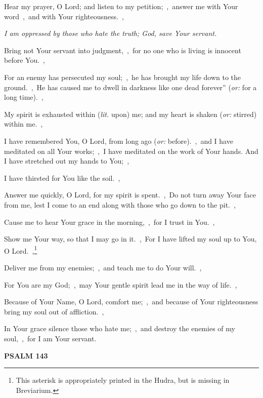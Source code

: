 \documentclass[12pt,twoside,a5paper]{article}
\newcommand{\psalm}[1]{\textbf{PSALM {#1}}\nopagebreak}
\newcommand{\qanona}[1]{{\liturgicalhint{Qanona.} \emph{#1}}}
\newcommand{\translationoption}[1]{\emph{or:} #1}
\newcommand{\translationliteral}[1]{\emph{lit.} #1}
\begin{document}
\begin{normalparskip}
  Hear my prayer, O Lord; and listen to my petition;~\sep\ answer me with Your word~\sep\ and with Your righteousness.~\sep

  \qanona{I am oppressed by those who hate the truth; God, save Your servant.}

  Bring not Your servant into judgment,~\sep\ for no one who is living is innocent before You.~\sep

  For an enemy has persecuted my soul;~\sep\ he has brought my life down to the ground.~\sep\ He has caused me to dwell in darkness like one dead forever'' (\translationoption{for a long time}).~\sep

  My spirit is exhausted within (\translationliteral{upon}) me; and my heart is shaken (\translationoption{stirred}) within me.~\sep

  I have remembered You, O Lord, from long ago (\translationoption{before}).~\sep\ and I have meditated on all Your works;~\sep\ I have meditated on the work of Your hands. And I have stretched out my hands to You;~\sep

  I have thirsted for You like the soil.~\sep

  Answer me quickly, O Lord, for my spirit is spent.~\sep\ Do not turn away Your face from me, lest I come to an end along with those who go down to the pit.~\sep

  Cause me to hear Your grace in the morning,~\sep\ for I trust in You.~\sep

  Show me Your way, so that I may go in it.~\sep\ For I have lifted my soul up to You, O Lord.~\sep\footnote{This asterisk is appropriately printed in the Hudra, but is missing in Breviarium.}

  Deliver me from my enemies;~\sep\ and teach me to do Your will.~\sep

  For You are my God;~\sep\ may Your gentle spirit lead me in the way of life.~\sep

  Because of Your Name, O Lord, comfort me;~\sep\ and because of Your righteousness bring my soul out of affliction.~\sep

  In Your grace silence those who hate me;~\sep\ and destroy the enemies of my soul,~\sep\ for I am Your servant.
\end{normalparskip}

\psalm{143}
\end{document}
